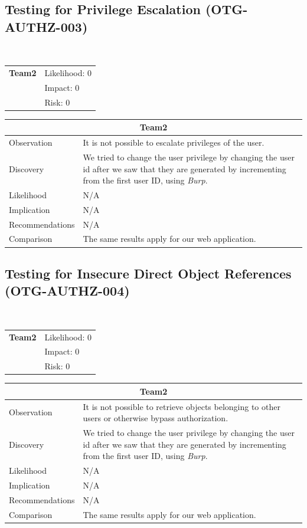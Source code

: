 \documentclass[headsepline,footsepline,footinclude=false,oneside,fontsize=11pt,paper=a4,listof=totoc,bibliography=totoc]{scrbook} %
\begin{document}
\subsection{Testing for Privilege Escalation (OTG-AUTHZ-003)}\

\begin{tabular}{cR{12cm}}
	\textbf{Team2} & Likelihood: 0\\& Impact: 0\\& Risk: 0
\end{tabular}

\begin{tabular}{ l|p{11cm}  }
	\hline
	\multicolumn{2}{c}{\textbf{Team2}} \\
	\hline
	Observation   & It is not possible to escalate privileges of the user.  \\
	Discovery  & We tried to change the user privilege by changing the user id after we saw that they are generated by incrementing from the first user ID, using \textit{Burp}.\\
	Likelihood & N/A \\
	Implication    & N/A \\
	Recommendations & N/A \\
	Comparison & The same results apply for our web application.\\
	\hline
\end{tabular}
\pagebreak

\subsection{Testing for Insecure Direct Object References (OTG-AUTHZ-004)}\
\begin{tabular}{cR{12cm}}
	\textbf{Team2} & Likelihood: 0\\& Impact: 0\\& Risk: 0
\end{tabular}

\begin{tabular}{ l|p{11cm}  }
	\hline
	\multicolumn{2}{c}{\textbf{Team2}} \\
	\hline
	Observation   & It is not possible to retrieve objects belonging to other users or otherwise bypass authorization.  \\
	Discovery  & We tried to change the user privilege by changing the user id after we saw that they are generated by incrementing from the first user ID, using \textit{Burp}.\\
	Likelihood & N/A \\
	Implication    & N/A \\
	Recommendations & N/A \\
	Comparison & The same results apply for our web application.\\
	\hline
\end{tabular}
\pagebreak
\end{document}
